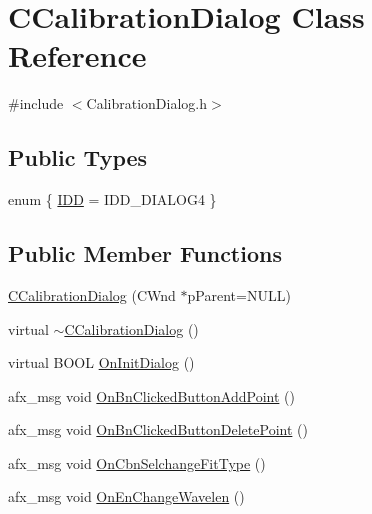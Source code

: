 \hypertarget{classCCalibrationDialog}{
\section{CCalibrationDialog Class Reference}
\label{classCCalibrationDialog}
}


{\ttfamily \#include $<$CalibrationDialog.h$>$}

\subsection*{Public Types}
\begin{DoxyCompactItemize}
\item 
enum \{ \hyperlink{classCCalibrationDialog_a3fb705c96f8b99665a8d2b40ed36f11fa57eba41a34c60aaa1d1d60fc7310ff86}{IDD} =  IDD\_\-DIALOG4
 \}
\end{DoxyCompactItemize}
\subsection*{Public Member Functions}
\begin{DoxyCompactItemize}
\item 
\hyperlink{classCCalibrationDialog_aacb00c57bb5f6232ea7cbdcb06c41dd8}{CCalibrationDialog} (CWnd $\ast$pParent=NULL)
\item 
virtual \hyperlink{classCCalibrationDialog_a2679e154901bdeda340bbbd9ce27deeb}{$\sim$CCalibrationDialog} ()
\item 
virtual BOOL \hyperlink{classCCalibrationDialog_ab6a78f071f1e6d86044591bb500355c1}{OnInitDialog} ()
\item 
afx\_\-msg void \hyperlink{classCCalibrationDialog_abc149fe574f82413f3f1e4246dffe8d3}{OnBnClickedButtonAddPoint} ()
\item 
afx\_\-msg void \hyperlink{classCCalibrationDialog_a90e91fe8e0bc31b1f39b1db183407f9d}{OnBnClickedButtonDeletePoint} ()
\item 
afx\_\-msg void \hyperlink{classCCalibrationDialog_a2e9ac55a33eeb27dd613168337b66675}{OnCbnSelchangeFitType} ()
\item 
afx\_\-msg void \hyperlink{classCCalibrationDialog_a15f211f5fc7c71ff33c970980f3d72ce}{OnEnChangeWavelen} ()
\end{DoxyCompactItemize}
